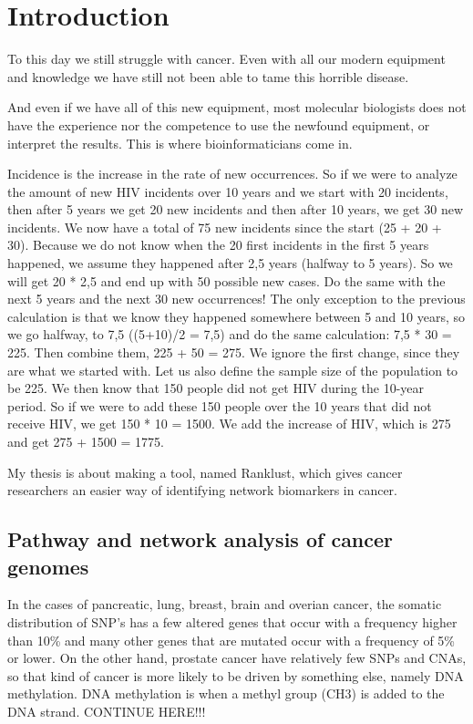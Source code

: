 \part{Introduction}
\label{pa:intro}
To this day we still struggle with cancer. Even with all our modern equipment
and knowledge we have still not been able to tame this horrible disease. 

And even if we have all of this new equipment, most molecular biologists does
not have the experience nor the competence to use the newfound equipment, or
interpret the results. This is where bioinformaticians come in. 

Incidence is the increase in the rate of new occurrences. So if we were to
analyze the amount of new HIV incidents over 10 years and we start with 20
incidents, then after 5 years we get 20 new incidents and then after 10 years,
we get 30 new incidents. We now have a total of 75 new incidents since the start
(25 + 20 + 30).  Because we do not know when the 20 first incidents in the first
5 years happened, we assume they happened after 2,5 years (halfway to 5 years).
So we will get 20 * 2,5 and end up with 50 possible new cases. Do the same with
the next 5 years and the next 30 new occurrences! The only exception to the
previous calculation is that we know they happened somewhere between 5 and 10
years, so we go halfway, to 7,5 ((5+10)/2 = 7,5) and do the same calculation:
7,5 * 30 = 225. Then combine them, 225 + 50 = 275. We ignore the first change,
since they are what we started with. Let us also define the sample size of the
population to be 225. We then know that 150 people did not get HIV during the
10-year period. So if we were to add these 150 people over the 10 years that did
not receive HIV, we get 150 * 10 = 1500. We add the increase of HIV, which is
275 and get 275 + 1500 = 1775. 

My thesis is about making a tool, named Ranklust, which gives cancer researchers
an easier way of identifying network biomarkers in cancer. 

\chapter{Pathway and network analysis of cancer genomes}
In the cases of pancreatic, lung, breast, brain and overian cancer, the somatic
distribution of SNP's has a few altered genes that occur with a frequency higher
than 10\% and many other genes that are mutated occur with a frequency of 5\% or
lower\cite{pathway-network}. On the other hand, prostate cancer have relatively
few SNPs and CNAs, so that kind of cancer is more likely to be driven by
something else, namely DNA methylation. DNA methylation is when a methyl group
(CH3) is added\cite{dna-methyl} to the DNA strand. CONTINUE HERE!!!

